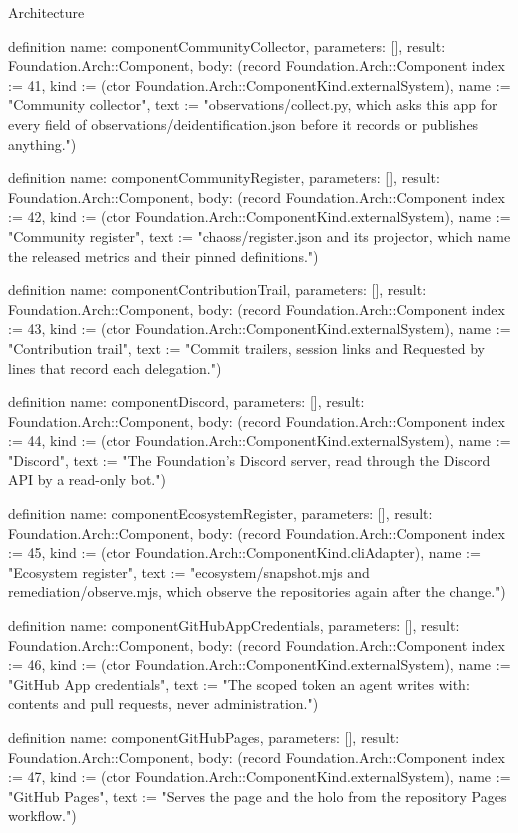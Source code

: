 \begin{lexlean}{Architecture}
\begin{semanticmodule}
definition{
  name: componentCommunityCollector,
  parameters: [],
  result: Foundation.Arch::Component,
  body: (record Foundation.Arch::Component {index := 41, kind := (ctor Foundation.Arch::ComponentKind.externalSystem), name := "Community collector", text := "observations/collect.py, which asks this app for every field of observations/deidentification.json before it records or publishes anything."})
}

definition{
  name: componentCommunityRegister,
  parameters: [],
  result: Foundation.Arch::Component,
  body: (record Foundation.Arch::Component {index := 42, kind := (ctor Foundation.Arch::ComponentKind.externalSystem), name := "Community register", text := "chaoss/register.json and its projector, which name the released metrics and their pinned definitions."})
}

definition{
  name: componentContributionTrail,
  parameters: [],
  result: Foundation.Arch::Component,
  body: (record Foundation.Arch::Component {index := 43, kind := (ctor Foundation.Arch::ComponentKind.externalSystem), name := "Contribution trail", text := "Commit trailers, session links and Requested by lines that record each delegation."})
}

definition{
  name: componentDiscord,
  parameters: [],
  result: Foundation.Arch::Component,
  body: (record Foundation.Arch::Component {index := 44, kind := (ctor Foundation.Arch::ComponentKind.externalSystem), name := "Discord", text := "The Foundation's Discord server, read through the Discord API by a read-only bot."})
}

definition{
  name: componentEcosystemRegister,
  parameters: [],
  result: Foundation.Arch::Component,
  body: (record Foundation.Arch::Component {index := 45, kind := (ctor Foundation.Arch::ComponentKind.cliAdapter), name := "Ecosystem register", text := "ecosystem/snapshot.mjs and remediation/observe.mjs, which observe the repositories again after the change."})
}

definition{
  name: componentGitHubAppCredentials,
  parameters: [],
  result: Foundation.Arch::Component,
  body: (record Foundation.Arch::Component {index := 46, kind := (ctor Foundation.Arch::ComponentKind.externalSystem), name := "GitHub App credentials", text := "The scoped token an agent writes with: contents and pull requests, never administration."})
}

definition{
  name: componentGitHubPages,
  parameters: [],
  result: Foundation.Arch::Component,
  body: (record Foundation.Arch::Component {index := 47, kind := (ctor Foundation.Arch::ComponentKind.externalSystem), name := "GitHub Pages", text := "Serves the page and the holo from the repository Pages workflow."})
}


\end{semanticmodule}
\end{lexlean}
